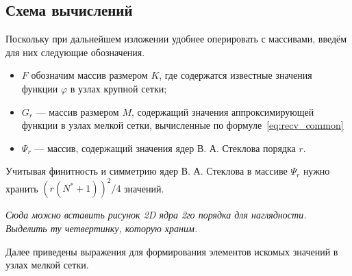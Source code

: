 





\subsection*{Схема вычислений}

Поскольку при дальнейшем изложении удобнее оперировать с 
массивами, введём для них следующие обозначения.
\begin{itemize}

\item
  $F$ обозначим массив размером $K$,
  где содержатся известные значения функции $\varphi$
  в узлах крупной сетки;

\item
  $G_r$ --- массив размером  $M$,
  содержащий 
  значения аппроксимирующей функции в узлах мелкой сетки,
  вычисленные по формуле~\eqref{eq:recv_common}
%

\item
  $\Psi_{r}$ --- массив, содержащий значения ядер В. А. Стеклова порядка $r$.
%

\end{itemize}


Учитывая финитность и симметрию ядер В. А. Стеклова
в массиве $\Psi_{r}$ нужно хранить $(r(N^*+1))^2/4$
значений.

\emph{Сюда можно вставить рисунок 2D ядра 2го порядка для наглядности.
Выделить ту четвертинку, которую храним.}

Далее приведены выражения для формирования
элементов искомых значений в узлах мелкой сетки.

